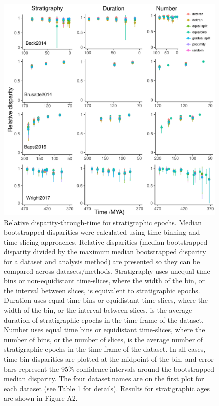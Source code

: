 \documentclass[12pt,a4paper]{article}
\begin{document}
  \begin{figure}[!htbp]
    \centering
    \includegraphics[width=1\linewidth, height=1\textheight, keepaspectratio]{figures/fig-dtt-epoch-appendix.pdf}
    \caption[Relative disparity through time for four example datasets.]
    {Relative disparity-through-time for stratigraphic epochs. 
    Median bootstrapped disparities were calculated using time binning and time-slicing approaches. 
    Relative disparities (median bootstrapped disparity divided by the maximum median bootstrapped disparity for a dataset and analysis method) are presented so they can be compared across datasets/methods. 
    Stratigraphy uses unequal time bins or non-equidistant time-slices, where the width of the bin, or the interval between slices, is equivalent to stratigraphic epochs. 
    Duration uses equal time bins or equidistant time-slices, where the width of the bin, or the interval between slices, is the average duration of stratigraphic epochs in the time frame of the dataset. 
    Number uses equal time bins or equidistant time-slices, where the number of bins, or the number of slices, is the average number of stratigraphic epochs in the time frame of the dataset. 
    In all cases, time bin disparities are plotted at the midpoint of the bin, and error bars represent the 95\% confidence intervals around the bootstrapped median disparity.
    The four dataset names are on the first plot for each dataset (see Table 1 for details).
    Results for stratigraphic ages are shown in Figure A2.}
    \label{figure:dtt2}
  \end{figure}  
\end{document}
